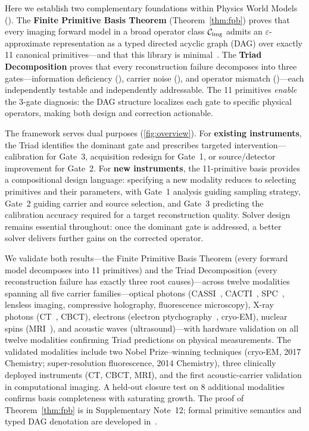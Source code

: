 Here we establish two complementary foundations within Physics World Models (\pwm{}). The \textbf{Finite Primitive Basis Theorem} (Theorem~\ref{thm:fpb}) proves that every imaging forward model in a broad operator class $\mathcal{C}_{\mathrm{img}}$ admits an $\varepsilon$-approximate representation as a typed directed acyclic graph (DAG) over exactly 11 canonical primitives---and that this library is minimal~\cite{yang2026fpt}. The \textbf{Triad Decomposition} proves that every reconstruction failure decomposes into three gates---information deficiency (\gateone{}), carrier noise (\gatetwo{}), and operator mismatch (\gatethree{})---each independently testable and independently addressable. The 11 primitives \emph{enable} the 3-gate diagnosis: the DAG structure localizes each gate to specific physical operators, making both design and correction actionable.

The framework serves dual purposes (\cref{fig:overview}). For \textbf{existing instruments}, the Triad identifies the dominant gate and prescribes targeted intervention---calibration for Gate~3, acquisition redesign for Gate~1, or source/detector improvement for Gate~2. For \textbf{new instruments}, the 11-primitive basis provides a compositional design language: specifying a new modality reduces to selecting primitives and their parameters, with Gate~1 analysis guiding sampling strategy, Gate~2 guiding carrier and source selection, and Gate~3 predicting the calibration accuracy required for a target reconstruction quality. Solver design remains essential throughout: once the dominant gate is addressed, a better solver delivers further gains on the corrected operator.

\begin{sloppypar}
We validate both results---the Finite Primitive Basis Theorem (every forward model decomposes into 11 primitives) and the Triad Decomposition (every reconstruction failure has exactly three root causes)---across twelve modalities spanning all five carrier families---optical photons (CASSI~\cite{wagadarikar2008cassi}, CACTI~\cite{llull2013cacti}, SPC~\cite{duarte2008spc}, lensless imaging, compressive holography, fluorescence microscopy), X-ray photons (CT~\cite{feldkamp1984practical}, CBCT), electrons (electron ptychography~\cite{rodenburg2004ptychography}, cryo-EM), nuclear spins (MRI~\cite{pruessmann1999sense,lustig2007sparse}), and acoustic waves (ultrasound)---with hardware validation on all twelve modalities confirming Triad predictions on physical measurements. The validated modalities include two Nobel Prize--winning techniques (cryo-EM, 2017 Chemistry; super-resolution fluorescence, 2014 Chemistry), three clinically deployed instruments (CT, CBCT, MRI), and the first acoustic-carrier validation in computational imaging. A held-out closure test on 8 additional modalities confirms basis completeness with saturating growth. The proof of Theorem~\ref{thm:fpb} is in Supplementary Note~12; formal primitive semantics and typed DAG denotation are developed in~\cite{yang2026fpt}.
\end{sloppypar}

